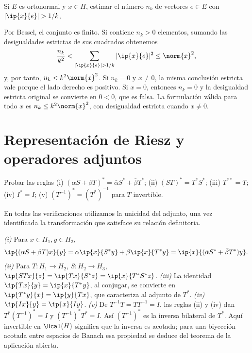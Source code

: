 \begin{ejercicio}\label{ej:lectura-31-7}
Si $E$ es ortonormal y $x\in H$, estimar el número $n_k$ de vectores $e\in E$ con $|\ip{x}{e}|>1/k$.
\end{ejercicio}
\begin{solucion}
Por Bessel, el conjunto es finito. Si contiene $n_k>0$ elementos, sumando las desigualdades estrictas de sus cuadrados obtenemos
\[
 \frac{n_k}{k^2}<\sum_{|\ip{x}{e}|>1/k}|\ip{x}{e}|^{2}\leq\norm{x}^{2},
\]
y, por tanto, $n_k<k^2\norm{x}^{2}$. Si $n_k=0$ y $x\ne0$, la misma conclusión estricta vale porque el lado derecho es positivo. Si $x=0$, entonces $n_k=0$ y la desigualdad estricta original se convierte en $0<0$, que es falsa. La formulación válida para todo $x$ es $n_k\leq k^2\norm{x}^{2}$, con desigualdad estricta cuando $x\ne0$.
\end{solucion}

\chapter{Representación de Riesz y operadores adjuntos}

\begin{ejercicio}\label{ej:lectura-32-1}
Probar las reglas (i) $(\alpha S+\beta T)^*=\bar\alpha S^*+\bar\beta T^*$; (ii) $(ST)^*=T^*S^*$; (iii) $T^{**}=T$; (iv) $I^*=I$; (v) $(T^{-1})^*=(T^*)^{-1}$ para $T$ invertible.
\end{ejercicio}
\begin{solucion}
En todas las verificaciones utilizamos la unicidad del adjunto, una vez identificada la transformación que satisface su relación definitoria.

\emph{(i)} Para $x\in H_1,y\in H_2$,
\[
 \ip{(\alpha S+\beta T)x}{y}
 =\alpha\ip{x}{S^*y}+\beta\ip{x}{T^*y}
 =\ip{x}{(\bar\alpha S^*+\bar\beta T^*)y}.
\]
\emph{(ii)} Para $T:H_1\to H_2$, $S:H_2\to H_3$,
$\ip{STx}{z}=\ip{Tx}{S^*z}=\ip{x}{T^*S^*z}$.
\emph{(iii)} La identidad $\ip{Tx}{y}=\ip{x}{T^*y}$, al conjugar, se convierte en $\ip{T^*y}{x}=\ip{y}{Tx}$, que caracteriza al adjunto de $T^*$.
\emph{(iv)} $\ip{Ix}{y}=\ip{x}{Iy}$.
\emph{(v)} De $T^{-1}T=TT^{-1}=I$, las reglas (ii) y (iv) dan
$T^*(T^{-1})^*=I$ y $(T^{-1})^*T^*=I$. Así $(T^{-1})^*$ es la inversa bilateral de $T^*$. Aquí invertible en $\Bcal(H)$ significa que la inversa es acotada; para una biyección acotada entre espacios de Banach esa propiedad se deduce del teorema de la aplicación abierta.
\end{solucion}

